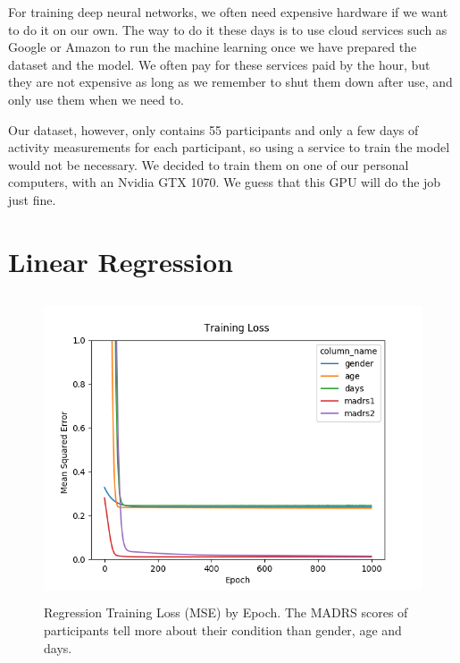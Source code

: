For training deep neural networks, we often need expensive hardware if we want to do it on our own. The way to do it these days is to use cloud services such as Google or Amazon to run the machine learning once we have prepared the dataset and the model. We often pay for these services paid by the hour, but they are not expensive as long as we remember to shut them down after use, and only use them when we need to.

Our dataset, however, only contains 55 participants and only a few days of activity measurements for each participant, so using a service to train the model would not be necessary. We decided to train them on one of our personal computers, with an Nvidia GTX 1070. We guess that this GPU will do the job just fine. 
 
\section{Linear Regression}

\begin{figure}
      \includegraphics[height=9cm]{img/regression/results_kerasregressor_1k_epochs.png}
      \caption{Regression Training Loss (MSE) by Epoch. The MADRS scores of participants tell more about their condition than gender, age and days.}
      \label{figure:regression_training_loss}
\end{figure}


